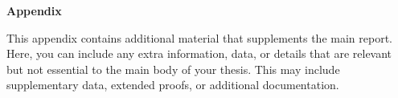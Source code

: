 \thispagestyle{plain}
\newpage

\begin{center} 
  \textbf{Appendix} 
\end{center}

\noindent
This appendix contains additional material that supplements the main report. Here, you can include any extra information, data, or details that are relevant but not essential to the main body of your thesis. This may include supplementary data, extended proofs, or additional documentation.

\vfill
\hspace{0pt}
\pagebreak